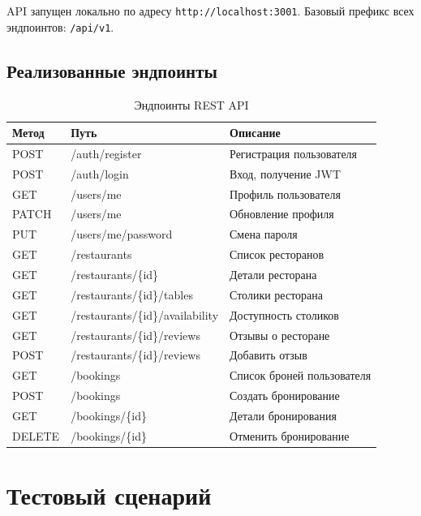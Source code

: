 \documentclass[a4paper,14pt]{extarticle}
\begin{document}
API запущен локально по адресу \texttt{http://localhost:3001}.
Базовый префикс всех эндпоинтов: \texttt{/api/v1}.

\subsection{Реализованные эндпоинты}

\begin{table}[H]
\centering
\caption{Эндпоинты REST API}
\begin{tabularx}{\textwidth}{llX}
\toprule
\textbf{Метод} & \textbf{Путь} & \textbf{Описание} \\
\midrule
POST   & /auth/register                       & Регистрация пользователя \\
POST   & /auth/login                          & Вход, получение JWT \\
GET    & /users/me                            & Профиль пользователя \\
PATCH  & /users/me                            & Обновление профиля \\
PUT    & /users/me/password                   & Смена пароля \\
GET    & /restaurants                         & Список ресторанов \\
GET    & /restaurants/\{id\}                  & Детали ресторана \\
GET    & /restaurants/\{id\}/tables           & Столики ресторана \\
GET    & /restaurants/\{id\}/availability     & Доступность столиков \\
GET    & /restaurants/\{id\}/reviews          & Отзывы о ресторане \\
POST   & /restaurants/\{id\}/reviews          & Добавить отзыв \\
GET    & /bookings                            & Список броней пользователя \\
POST   & /bookings                            & Создать бронирование \\
GET    & /bookings/\{id\}                     & Детали бронирования \\
DELETE & /bookings/\{id\}                     & Отменить бронирование \\
\bottomrule
\end{tabularx}
\end{table}

\section{Тестовый сценарий}
\end{document}
